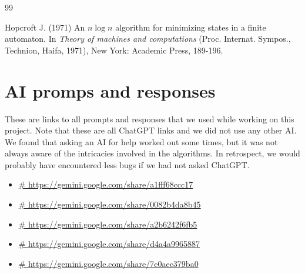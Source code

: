 \documentclass[twoside]{article}
\begin{document}
\begin{thebibliography}{99}

Hopcroft J. (1971) An $n\log n$ algorithm for minimizing states in a finite automaton. In \emph{Theory of machines and computations} (Proc. Internat. Sympos., Technion, Haifa, 1971), New York: Academic Press, 189-196.

\end{thebibliography}



\appendix

\section{AI promps and responses}
These are links to all prompts and responses that we used while working on this project. Note that these are all ChatGPT links and we did not use any other AI. We found that asking an AI for help worked out some times, but it was not always aware of the intricacies involved in the algorithms. In retrospect, we would probably have encountered less bugs if we had not asked ChatGPT.

\begin{itemize}
	\item \url{# https://gemini.google.com/share/a1fff68ccc17}
    \item \url{# https://gemini.google.com/share/0082b4da8b45}
    \item \url{# https://gemini.google.com/share/a2b6242f6fb5}
    \item \url{# https://gemini.google.com/share/d4a4a9965887}
    \item \url{# https://gemini.google.com/share/7e0aec379ba0}
\end{itemize}
\end{document}
